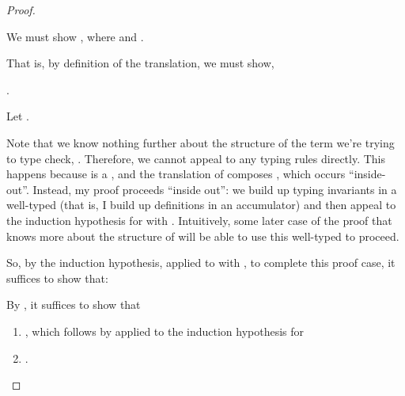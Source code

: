 {\begin{proof}
\begin{proofcases}
      We must show \im{\styjudg{\anfh{\slenv}}{\anf{\ssnde{\se}}{\tK}}{\tB}},
      where
      \im{\styjudg{\anfh{\slenv},\edefs{\ssnde{\se}}}{\tK}{(\ehole{\ssnde{\se}} : \anfh{\subst{\sBpr}{\sfste{\se}}{\sx}}) \Rightarrow\tB}}
      and \im{\styjudg{\slenv}{\se}{\ssigmaty{\sx}{\sApr}{\sBpr}}}.

      That is, by definition of the translation, we must show,

      \im{\styjudg{\anfh{\slenv}}{\anf{\se}{\tlete{\txpr}{\hole}{\tK\hw{\tsnde{\txpr}}}}}{\tB}}.

      Let \im{\tKpr = {\tlete{\txpr}{\hole}{\tK\hw{\tsnde{\txpr}}}}}.

      Note that we know nothing further about the structure of the term
      we're trying to type check, \im{\anfh{\se}{\tKpr}}.
      Therefore, we cannot appeal to any typing rules directly.
      This happens because \im{\se} is a , and the translation of
       composes , which occurs ``inside-out''.
      Instead, my proof proceeds ``inside out'': we build up typing invariants
      in a well-typed  \im{\tKpr} (that is, I build up
      definitions in an accumulator) and then appeal to the induction hypothesis
      for \im{\se} with \im{\tKpr}.
      Intuitively, some later case of the proof that knows more about the
      structure of \im{\se} will be able to use this well-typed
       to proceed.

      So, by the induction hypothesis, applied to
      \im{\styjudg{\slenv}{\se}{\ssigmaty{\sx}{\sApr}{\sBpr}}} with \im{\tKpr},
      to complete this proof case, it suffices to show that:
      \im{\styjudg{\anfh{\slenv},\edefs{\se}}{\tlete{\txpr}{\hole}{\tK\hw{\tsnde{\txpr}}}}{(\ehole{\se} : \anfh{\ssigmaty{\sx}{\sApr}{\sBpr}}) \Rightarrow \tB}}

      By , it suffices to show that
      \begin{enumerate}[leftmargin=*]
      \item \label{prf:anf:type-pres:snd-0}
        \im{\styjudg{\anfh{\slenv},\edefs{\se}}{\ehole{\se}}{\anfh{\ssigmaty{\sx}{\sApr}{\sBpr}}}},
           which follows by  applied to the
           induction hypothesis for
           \im{\styjudg{\slenv}{\se}{\ssigmaty{\sx}{\sApr}{\sBpr}}}
      \item \label{prf:anf:type-pres:snd-1} \im{\styjudg{\anfh{\slenv},\edefs{\se},\txpr = \ehole{\se}}{\tK\hw{\tsnde{\txpr}}}{\tB}}.
      \end{enumerate}


\end{proofcases}
\end{proof}}
